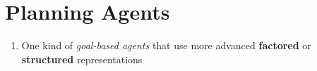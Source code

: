 \section{Planning Agents}\label{AI: Agent Programs/Planning Agents}


\begin{enumerate}[itemsep=0.2cm]
    \item One kind of \textit{goal-based agents} that use more advanced \textbf{factored} or \textbf{structured} representations
    \hfill \cite{ai/book/Artificial-Intelligence-A-Modern-Approach/Russell-Norvig}



\end{enumerate}














